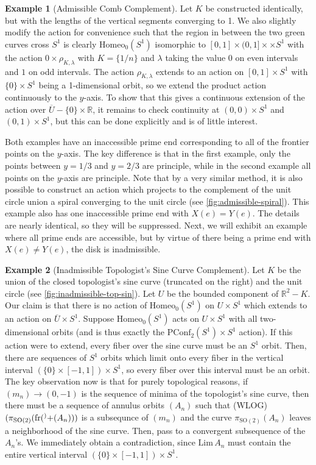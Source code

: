 \documentclass[10pt, oneside]{article}
\newcommand{\R}{\mathbb{R}}
\newcommand{\SO}[1][2]{\text{SO}(#1)}
\newcommand{\homeo}[1][S^1]{\text{Homeo}_0(#1)}
\newcommand{\cl}[1]{\overline{#1}}
\newcommand{\pconf}[2][S^1]{\text{PConf}_{#2}(#1)}
\newcommand{\klim}[1]{\text{Lim}\,#1}
\newcommand{\fr}[1]{\text{fr}(#1)}
\theoremstyle{definition}
\newtheorem{eg}{Example}[section]
\theoremstyle{definition}
\begin{document}
\begin{eg}[Admissible Comb Complement]
    Let $K$ be constructed identically, but with the lengths of the vertical segments converging to 1. We also slightly modify the action for convenience such that the region in between the two green curves cross $S^1$ is clearly $\homeo$ isomorphic to $[0, 1]\times (0,1]\times \times S^1$ with the action $0\times \rho_{K, \lambda}$ with $K=\{1/n\}$ and $\lambda$ taking the value $0$ on even intervals and $1$ on odd intervals. The action $\rho_{K, \lambda}$ extends to an action on $[0,1]\times S^1$ with $\{0\}\times S^1$ being a 1-dimensional orbit, so we extend the product action continuously to the $y$-axis. To show that this gives a continuous extension of the action over $\cl{U}-\{0\}\times \R$, it remains to check continuity at $(0,0)\times S^1$ and $(0,1)\times S^1$, but this can be done explicitly and is of little interest.
\end{eg}

Both examples have an inaccessible prime end corresponding to all of the frontier points on the $y$-axis. The key difference is that in the first example, only the points between $y=1/3$ and $y=2/3$ are principle, while in the second example all points on the $y$-axis are principle. Note that by a very similar method, it is also possible to construct an action which projects to the complement of the unit circle union a spiral converging to the unit circle (see \cref{fig:admissible-spiral}). This example also has one inaccessible prime end with $X(e)=Y(e)$. The details are nearly identical, so they will be suppressed. Next, we will exhibit an example where all prime ends are accessible, but by virtue of there being a prime end with $X(e)\neq Y(e)$, the disk is inadmissible.




\begin{eg}[Inadmissible Topologist's Sine Curve Complement]
    Let $K$ be the union of the closed topologist's sine curve (truncated on the right) and the unit circle (see \cref{fig:inadmissible-top-sin}). Let $U$ be the bounded component of $\R^2 - K$. Our claim is that there is no action of $\homeo$ on $U\times S^1$ which extends to an action on $\cl{U}\times S^1$. Suppose $\homeo$ acts on $U\times S^1$ with all two-dimensional orbits (and is thus exactly the $\pconf{2}\times S^1$ action). If this action were to extend, every fiber over the sine curve must be an $S^1$ orbit. Then, there are sequences of $S^1$ orbits which limit onto every fiber in the vertical interval $(\{0\}\times [-1, 1])\times S^1$, so every fiber over this interval must be an orbit. The key observation now is that for purely topological reasons, if $(m_n)\to (0,-1)$ is the sequence of minima of the topologist's sine curve, then there must be a sequence of annulus orbits $(A_n)$ such that (WLOG) $(\pi_{\SO}(\fr^+(A_n)))$ is a subsequnce of $(m_n)$ and the curve $\pi_{\SO}(A_n)$ leaves a neighborhood of the sine curve. Then, pass to a convergent subsequence of the $A_n$'s. We immediately obtain a contradiction, since $\klim{A_n}$ must contain the entire vertical interval $(\{0\}\times[-1, 1])\times S^1$.
\end{eg}
\end{document}

